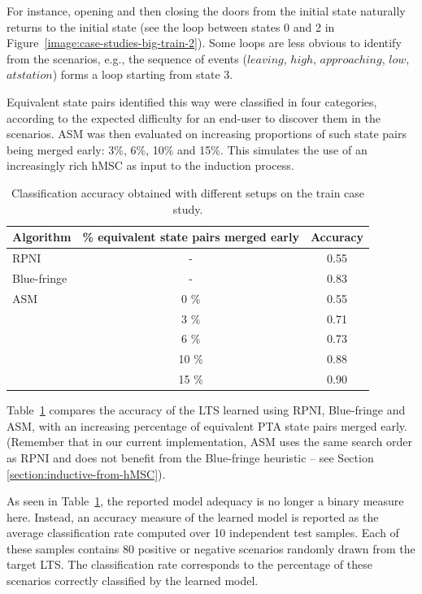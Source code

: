 For instance, opening and then closing the doors from the initial state naturally returns to the initial state (see the loop between states 0 and 2 in Figure~\ref{image:case-studies-big-train-2}). Some loops are less obvious to identify from the scenarios, e.g., the sequence of events ($leaving$, $high$, $approaching$, $low$, $at station$) forms a loop starting from state 3. 

Equivalent state pairs identified this way were classified in four categories, according to the expected difficulty for an end-user to discover them in the scenarios. ASM was then evaluated on increasing proportions of such state pairs being merged early: 3\%, 6\%, 10\% and 15\%. This simulates the use of an increasingly rich hMSC as input to the induction process. 

\begin{table}[H]
\centering
\small
\begin{tabular}{|l|c|c|}\hline
Algorithm& \% equivalent state pairs merged early &Accuracy\\\hline\hline
RPNI      & -    & 0.55\\\hline
Blue-fringe& -   & 0.83\\\hline
ASM       & 0 \%  & 0.55\\\cline{2-3}
          & 3 \%  & 0.71\\\cline{2-3}
          & 6 \%  & 0.73\\\cline{2-3}
          & 10 \% & 0.88\\\cline{2-3}
          & 15 \% & 0.90\\\hline
\end{tabular}
\caption{Classification accuracy obtained with different setups on the train case study.\label{RE:experesults}}
\end{table} 

Table~\ref{RE:experesults} compares the accuracy of the LTS learned using RPNI, Blue-fringe and ASM, with an increasing percentage of equivalent PTA state pairs merged early. (Remember that in our current implementation, ASM uses the same search order as RPNI and does not benefit from the Blue-fringe heuristic -- see Section \ref{section:inductive-from-hMSC}).

As seen in Table~\ref{RE:experesults}, the reported model adequacy is no longer a binary measure here. Instead, an accuracy measure of the learned model is reported as the average classification rate computed over 10 independent test samples. Each of these samples contains 80 positive or negative scenarios randomly drawn from the target LTS. The classification rate corresponds to the percentage of these scenarios correctly classified by the learned model. 

